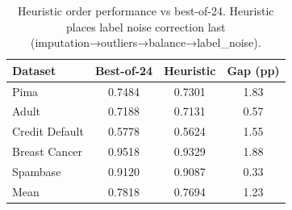 \begin{table}[t]
\small
\centering
\caption{Heuristic order performance vs best-of-24. Heuristic places 
label noise correction last (imputation→outliers→balance→label\_noise).}
\label{tab:heuristic}
\begin{tabular}{lccc}
\toprule
Dataset & Best-of-24 & Heuristic & Gap (pp) \\
\midrule
Pima & 0.7484 & 0.7301 & 1.83 \\
Adult & 0.7188 & 0.7131 & 0.57 \\
Credit Default & 0.5778 & 0.5624 & 1.55 \\
Breast Cancer & 0.9518 & 0.9329 & 1.88 \\
Spambase & 0.9120 & 0.9087 & 0.33 \\
\midrule
Mean & 0.7818 & 0.7694 & 1.23 \\
\bottomrule
\end{tabular}
\end{table}
